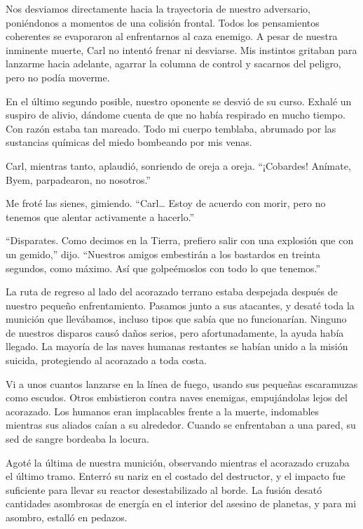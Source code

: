 Nos desviamos directamente hacia la trayectoria de nuestro adversario, poniéndonos a momentos de una colisión frontal. Todos los pensamientos coherentes se evaporaron al enfrentarnos al caza enemigo. A pesar de nuestra inminente muerte, Carl no intentó frenar ni desviarse. Mis instintos gritaban para lanzarme hacia adelante, agarrar la columna de control y sacarnos del peligro, pero no podía moverme.

En el último segundo posible, nuestro oponente se desvió de su curso. Exhalé un suspiro de alivio, dándome cuenta de que no había respirado en mucho tiempo. Con razón estaba tan mareado. Todo mi cuerpo temblaba, abrumado por las sustancias químicas del miedo bombeando por mis venas.

Carl, mientras tanto, aplaudió, sonriendo de oreja a oreja. “¡Cobardes! Anímate, Byem, parpadearon, no nosotros.”

Me froté las sienes, gimiendo. “Carl… Estoy de acuerdo con morir, pero no tenemos que alentar activamente a hacerlo.”

“Disparates. Como decimos en la Tierra, prefiero salir con una explosión que con un gemido,” dijo. “Nuestros amigos embestirán a los bastardos en treinta segundos, como máximo. Así que golpeémoslos con todo lo que tenemos.”

La ruta de regreso al lado del acorazado terrano estaba despejada después de nuestro pequeño enfrentamiento. Pasamos junto a sus atacantes, y desaté toda la munición que llevábamos, incluso tipos que sabía que no funcionarían. Ninguno de nuestros disparos causó daños serios, pero afortunadamente, la ayuda había llegado. La mayoría de las naves humanas restantes se habían unido a la misión suicida, protegiendo al acorazado a toda costa.

Vi a unos cuantos lanzarse en la línea de fuego, usando sus pequeñas escaramuzas como escudos. Otros embistieron contra naves enemigas, empujándolas lejos del acorazado. Los humanos eran implacables frente a la muerte, indomables mientras sus aliados caían a su alrededor. Cuando se enfrentaban a una pared, su sed de sangre bordeaba la locura.

Agoté la última de nuestra munición, observando mientras el acorazado cruzaba el último tramo. Enterró su nariz en el costado del destructor, y el impacto fue suficiente para llevar su reactor desestabilizado al borde. La fusión desató cantidades asombrosas de energía en el interior del asesino de planetas, y para mi asombro, estalló en pedazos.

